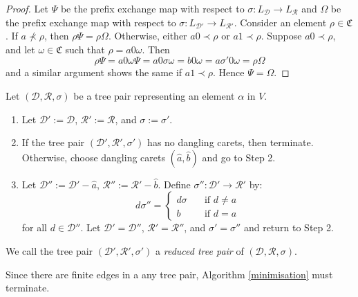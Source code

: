 \documentclass[12pt]{amsart}
\newcommand{\seteq}{:=}
\newcommand{\wh}[1]{\widehat{#1}}
\newcommand{\CS}{\mathfrak{C}}
\newcommand{\D}{\mathcal{D}}
\newcommand{\R}{\mathcal{R}}
\begin{document}
        \begin{proof}
            Let $\Psi$ be the prefix exchange map with respect to $\sigma: L_\D \to L_\R$ and $\Omega$ be the prefix exchange map with respect to $\sigma: L_{\D'} \to L_{\R'}$. Consider an element $\rho \in \CS$. If $a \nprec \rho$, then $\rho \Psi = \rho \Omega$. Otherwise, either $a0 \prec \rho$ or $a1 \prec \rho$. Suppose $a0 \prec \rho$, and let $\omega \in \CS$ such that $\rho = a0\omega$. Then $$\rho \Psi = a0\omega \Psi = a0 \sigma \omega = b0 \omega = a \sigma' 0 \omega = \rho \Omega$$ and a similar argument shows the same if $a1 \prec \rho$. Hence $\Psi = \Omega$.
        \end{proof}
    
        \begin{algorithm}[Minimisation]\label{minimisation}

            Let $(\D,\R,\sigma)$ be a tree pair representing an element $\alpha$ in $V$. 
    
            \begin{enumerate}[label=Step \arabic*:]
            
                \item Let $\D' \seteq \D$, $\R' \seteq \R$, and $\sigma \seteq \sigma'$.
            
                \item If the tree pair $(\D', \R', \sigma')$ has no dangling carets, then terminate. Otherwise, choose dangling carets $(\wh{a},\wh{b})$ and go to Step 2.
        
                \item Let $\D''\seteq\D' -\wh{a}$, $\R''\seteq\R' -\wh{b}$. Define $\sigma'':\D' \rightarrow\R'$ by:
                $$d \sigma'' = \begin{cases} d\sigma \quad &\text{if } d \neq a \\ b \quad &\text{if } d=a \end{cases}$$ for all $d\in\D''$. Let $\D' = \D''$, $\R' = \R''$, and $\sigma' = \sigma''$ and return to Step 2. 
        
            \end{enumerate}
            
            We call the tree pair $(\D', \R', \sigma')$ a \textit{reduced tree pair} of $(\D,\R,\sigma)$.
            
        \end{algorithm}
        
        Since there are finite edges in a any tree pair, Algorithm \ref{minimisation} must terminate.
        
\end{document}
